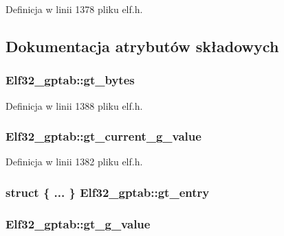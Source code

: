 Definicja w linii 1378 pliku elf.\-h.



\subsection{Dokumentacja atrybutów składowych}
\hypertarget{union_elf32__gptab_a1af9c483170a1b9e966d4c728934c7e0}{
\subsubsection[{gt\-\_\-bytes}]{ Elf32\-\_\-gptab\-::gt\-\_\-bytes}}\label{union_elf32__gptab_a1af9c483170a1b9e966d4c728934c7e0}


Definicja w linii 1388 pliku elf.\-h.

\hypertarget{union_elf32__gptab_a89ae523fa83704dc11651942f14b23f3}{
\subsubsection[{gt\-\_\-current\-\_\-g\-\_\-value}]{ Elf32\-\_\-gptab\-::gt\-\_\-current\-\_\-g\-\_\-value}}\label{union_elf32__gptab_a89ae523fa83704dc11651942f14b23f3}


Definicja w linii 1382 pliku elf.\-h.

\hypertarget{union_elf32__gptab_af0c0a5a25eff0b2129de1589a3eb6841}{
\subsubsection[{gt\-\_\-entry}]{\setlength{\rightskip}{0pt plus 5cm}struct \{ ... \}   Elf32\-\_\-gptab\-::gt\-\_\-entry}}\label{union_elf32__gptab_af0c0a5a25eff0b2129de1589a3eb6841}
\hypertarget{union_elf32__gptab_a5c6035560c772d9b020e5110dbb435b8}{
\subsubsection[{gt\-\_\-g\-\_\-value}]{ Elf32\-\_\-gptab\-::gt\-\_\-g\-\_\-value}}\label{union_elf32__gptab_a5c6035560c772d9b020e5110dbb435b8}


